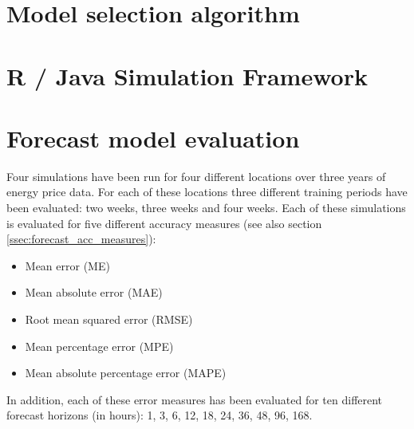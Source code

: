 \section{Model selection algorithm}



\section{R / Java Simulation Framework}



\section{Forecast model evaluation}













Four simulations have been run for four different locations over three years of energy price data. 
For each of these locations three different training periods have been evaluated: two weeks, three weeks and four weeks. 
Each of these simulations is evaluated for five different accuracy measures (see also section \ref{ssec:forecast_acc_measures}): 

\begin{itemize}
	\item Mean error (ME)
	\item Mean absolute error (MAE)
	\item Root mean squared error (RMSE)
	\item Mean percentage error (MPE)
	\item Mean absolute percentage error (MAPE)
\end{itemize}

In addition, each of these error measures has been evaluated for ten different forecast horizons (in hours): 
1, 3, 6, 12, 18, 24, 36, 48, 96, 168. 

